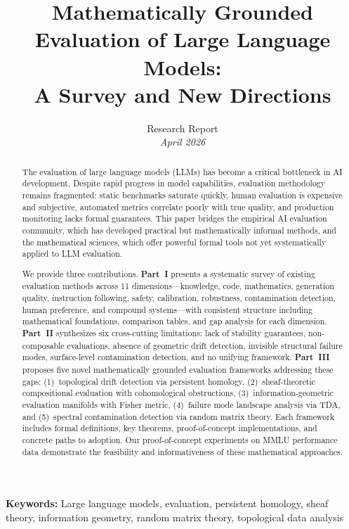 \documentclass[11pt]{article}
\title{\textbf{Mathematically Grounded Evaluation of Large Language Models:\\A Survey and New Directions}}
\author{
Research Report\\
\textit{April 2026}
}
\date{}
\begin{document}
\maketitle

\begin{abstract}
The evaluation of large language models (LLMs) has become a critical bottleneck in AI development. Despite rapid progress in model capabilities, evaluation methodology remains fragmented: static benchmarks saturate quickly, human evaluation is expensive and subjective, automated metrics correlate poorly with true quality, and production monitoring lacks formal guarantees. This paper bridges the empirical AI evaluation community, which has developed practical but mathematically informal methods, and the mathematical sciences, which offer powerful formal tools not yet systematically applied to LLM evaluation.

We provide three contributions. \textbf{Part~I} presents a systematic survey of existing evaluation methods across 11 dimensions---knowledge, code, mathematics, generation quality, instruction following, safety, calibration, robustness, contamination detection, human preference, and compound systems---with consistent structure including mathematical foundations, comparison tables, and gap analysis for each dimension. \textbf{Part~II} synthesizes six cross-cutting limitations: lack of stability guarantees, non-composable evaluations, absence of geometric drift detection, invisible structural failure modes, surface-level contamination detection, and no unifying framework. \textbf{Part~III} proposes five novel mathematically grounded evaluation frameworks addressing these gaps: (1)~topological drift detection via persistent homology, (2)~sheaf-theoretic compositional evaluation with cohomological obstructions, (3)~information-geometric evaluation manifolds with Fisher metric, (4)~failure mode landscape analysis via TDA, and (5)~spectral contamination detection via random matrix theory. Each framework includes formal definitions, key theorems, proof-of-concept implementations, and concrete paths to adoption. Our proof-of-concept experiments on MMLU performance data demonstrate the feasibility and informativeness of these mathematical approaches.
\end{abstract}

\textbf{Keywords:} Large language models, evaluation, persistent homology, sheaf theory, information geometry, random matrix theory, topological data analysis

\newpage
\tableofcontents
\newpage
\end{document}
